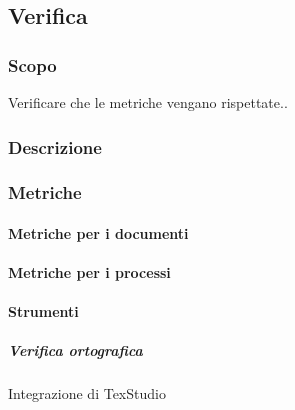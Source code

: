 	\subsection{Verifica}

		\subsubsection{Scopo}
		Verificare che le metriche vengano rispettate..


		\subsubsection{Descrizione}

		\subsubsection{Metriche}

			\paragraph{Metriche per i documenti}

			\paragraph{Metriche per i processi}



			\paragraph{Strumenti}


			\subparagraph{Verifica ortografica}
			Integrazione di TexStudio

